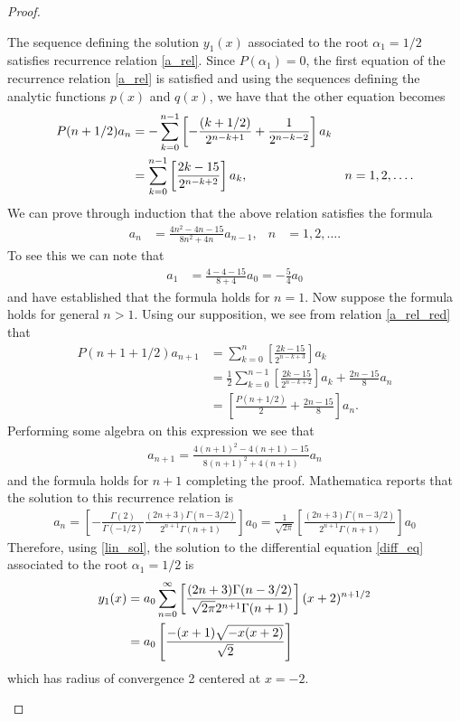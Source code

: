 \documentclass[12pt]{article}
\theoremstyle{definition}
\begin{document}
\begin{proof}
\begin{enumerate}
      The sequence defining the solution $y_1(x)$ associated to the root $\alpha_1 = 1/2$ satisfies recurrence relation \eqref{a_rel}.
      Since $P(\alpha_1) = 0$, the first equation of the recurrence relation \eqref{a_rel} is satisfied and
      using the sequences defining the analytic functions $p(x)$ and $q(x)$, we have that the other equation becomes
      \begin{align}\label{a_rel_red}
        P(n + 1/2) a_n &= -\sum_{k=0}^{n-1}\left[-\frac{(k + 1/2)}{2^{n-k+1}} + \frac{1}{2^{n-k-2}}\right]a_k & & \notag\\
        &=\sum_{k=0}^{n-1}\left[\frac{2k-15}{2^{n-k+2}}\right]a_k, &n&=1,2,\dots.
      \end{align}
      We can prove through induction that the above relation satisfies the formula
      \begin{align*}
        a_n &= \frac{4n^2-4n-15}{8n^2+4n}a_{n-1}, &n&=1,2,\dots.
      \end{align*}
      To see this we can note that
      \begin{align*}
        a_1 &= \frac{4 - 4 - 15}{8 + 4}a_0 = -\frac{5}{4}a_0
      \end{align*}
      and have established that the formula holds for $n=1$. Now suppose the formula
      holds for general $n > 1$. Using our supposition, we see from relation \eqref{a_rel_red} that
      \begin{align*}
        P(n + 1 + 1/2) a_{n+1} &= \sum_{k=0}^{n}\left[\frac{2k-15}{2^{n-k+3}}\right]a_k \\
        &= \frac{1}{2}\sum_{k=0}^{n-1}\left[\frac{2k-15}{2^{n-k+2}}\right]a_k + \frac{2n-15}{8}a_n \\
        &= \left[\frac{P(n + 1/2)}{2} + \frac{2n-15}{8}\right]a_n.
      \end{align*}
      Performing some algebra on this expression we see that
      \begin{align*}
        a_{n+1} = \frac{4(n+1)^2-4(n+1)-15}{8(n+1)^2+4(n+1)}a_{n}
      \end{align*}
      and the formula holds for $n+1$ completing the proof.
      Mathematica reports that the solution to this recurrence relation is
      \begin{align*}
        a_n = \left[-\frac{\Gamma(2)}{\Gamma(-1/2)}\frac{(2n+3)\Gamma(n-3/2)}{2^{n+1}\Gamma(n+1)}\right]a_0 = \frac{1}{\sqrt{2\pi}}\left[\frac{(2n+3)\Gamma(n-3/2)}{2^{n+1}\Gamma(n+1)}\right]a_0
      \end{align*}
      Therefore, using \eqref{lin_sol}, the solution to the differential equation \eqref{diff_eq} associated to the root $\alpha_1 = 1/2$
      is
      \begin{align}\label{y1_sol}
        y_1(x) &= a_0 \sum_{n=0}^\infty \left[\frac{(2n+3)\Gamma(n-3/2)}{\sqrt{2\pi}2^{n+1}\Gamma(n+1)}\right](x+2)^{n+1/2} \notag \\
        &= a_0\left[\frac{-(x+1)\sqrt{-x(x+2)}}{\sqrt{2}}\right]
      \end{align}
      which has radius of convergence 2 centered at $x=-2$.


\end{enumerate}
\end{proof}
\end{document}
